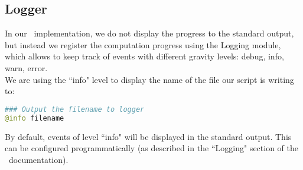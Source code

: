 \subsection*{Logger}

In our \julia\ implementation, we do not display the progress to the standard output, but instead we register the computation progress using the Logging module, which allows to keep track of events with different gravity levels: debug, info, warn, error. \\

We are using the ``info" level to display the name of the file our script is writing to:
\begin{lstlisting}[language=python]
### Output the filename to logger
@info filename
\end{lstlisting}

\bigskip

By default, events of level ``info" will be displayed in the standard output. This can be configured programmatically (as described in the ``Logging" section of the \julia\ documentation). \\

